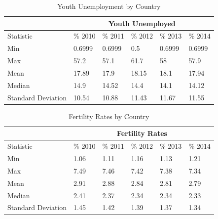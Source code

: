 \documentclass{article}
\begin{document}
\begin{table}[ht]
\centering
\begin{tabular}{|l|l|l|l|l|l|}
\hline
          &  \multicolumn{5}{c|}{Youth Unemployed} \\ \hline
Statistic          &  \%  2010 &  \% 2011 &  \% 2012 &  \%  2013 & \% 2014 \\ \hline
Min                & 0.6999                    & 0.6999                    & 0.5                       & 0.6999                    & 0.6999                    \\ \hline
Max                & 57.2                      & 57.1                      & 61.7                      & 58                        & 57.9                      \\ \hline
Mean               & 17.89                     & 17.9                      & 18.15                     & 18.1                      & 17.94                     \\ \hline
Median             & 14.9                      & 14.52                     & 14.4                      & 14.1                      & 14.12                     \\ \hline
Standard Deviation & 10.54                     & 10.88                     & 11.43                     & 11.67                     & 11.55                     \\ \hline
\end{tabular}
\caption{Youth Unemployment by Country}
\label{summary-statistic-table-youth-unemployment}
\end{table}
\begin{table}[ht]
\centering
\begin{tabular}{|l|l|l|l|l|l|}
\hline
          &  \multicolumn{5}{c|}{Fertility Rates} \\ \hline
Statistic          &  \%  2010 &  \% 2011 &  \% 2012 &  \%  2013 & \% 2014 \\ \hline
Min                & 1.06                   & 1.11                   & 1.16                   & 1.13                   & 1.21                   \\ \hline
Max                & 7.49                   & 7.46                   & 7.42                   & 7.38                   & 7.34                   \\ \hline
Mean               & 2.91                   & 2.88                   & 2.84                   & 2.81                   & 2.79                   \\ \hline
Median             & 2.41                   & 2.37                   & 2.34                   & 2.34                   & 2.33                   \\ \hline
Standard Deviation & 1.45                   & 1.42                   & 1.39                   & 1.37                   & 1.34                   \\ \hline
\end{tabular}
\caption{Fertility Rates by Country}
\label{summary-statistic-table-fertility}
\end{table}
\end{document}
